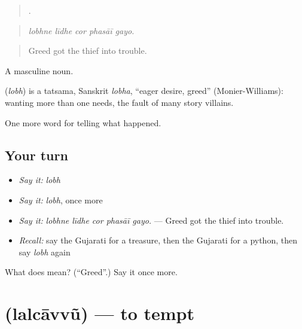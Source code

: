 \begin{quote}
    .
\end{quote}

\begin{quote}
\emph{lobhne līdhe cor phasāī gayo.}
\end{quote}

\begin{quote}
Greed got the thief into trouble.
\end{quote}

A masculine noun.

\begin{cousinweb}
\textbf{} (\emph{lobh}) is a tatsama, Sanskrit \emph{lobha}, \textquotedblleft{}eager desire, greed\textquotedblright{} (Monier-Williams): wanting more than one needs, the fault of many story villains.
\end{cousinweb}

\begin{grammarlens}[title={What you've built}]
One more word for telling what happened.
\end{grammarlens}

\subsection*{Your turn}
\begin{itemize}
\raggedright
  \item \emph{Say it:} \emph{lobh}
  \item \emph{Say it:} \emph{lobh}, once more
  \item \emph{Say it:} \emph{lobhne līdhe cor phasāī gayo.} — Greed got the thief into trouble.
  \item \emph{Recall:} say the Gujarati for a treasure, then the Gujarati for a python, then say \emph{lobh} again
\end{itemize}

\begin{tcolorbox}[breakable,colback=teal!4,colframe=teal!35!black,title={Before you move on}]
What does  mean? (\textquotedblleft{}Greed\textquotedblright{}.) Say it once more.
\end{tcolorbox}
\section[\texorpdfstring{\gu{લલચાવવું} (lalcāvvũ)}{લલચાવવું (lalcāvvũ)}]{ (lalcāvvũ) — to tempt}

